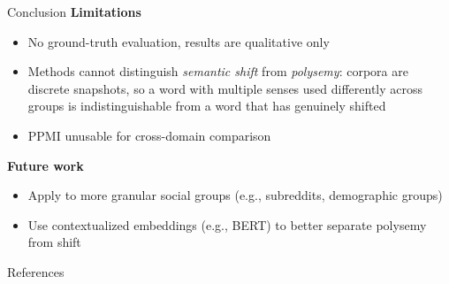 \documentclass[aspectratio=169]{beamer}
\begin{document}
\begin{frame}{Conclusion}
    \textbf{Limitations}
    \begin{itemize}
        \item No ground-truth evaluation, results are qualitative only
        \item Methods cannot distinguish \textit{semantic shift} from \textit{polysemy}: corpora are discrete snapshots, so a word with multiple senses used differently across groups is indistinguishable from a word that has genuinely shifted
        \item PPMI unusable for cross-domain comparison
    \end{itemize}

    \vspace{0.2cm}

    \textbf{Future work}
    \begin{itemize}
        \item Apply to more granular social groups (e.g., subreddits, demographic groups)
        \item Use contextualized embeddings (e.g., BERT) to better separate polysemy from shift
    \end{itemize}
\end{frame}

\begin{frame}{References}
    \tiny
    \nocite{*}
    
    
\end{frame}
\end{document}
